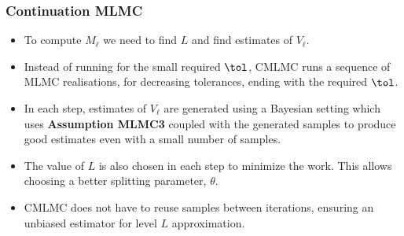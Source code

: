 


\begin{frame}\frametitle{Continuation MLMC}
\begin{itemize}
\item To compute $M_\ell$ we need to find $L$ and find estimates of
  $V_\ell$.
\pause
    \item Instead of running for the small required $\tol$, CMLMC runs
      a sequence of MLMC realisations, for decreasing
      tolerances, ending with the required $\tol$.
    \item In each step, estimates of $V_\ell$ are generated using a
      Bayesian setting which uses {\bf Assumption MLMC3} coupled with
      the generated samples to produce good estimates even with a
      small number of samples.
    \item The value of $L$ is also chosen in each step to minimize the
      work. This allows choosing a better splitting parameter,
      $\theta$.
    \item CMLMC does not have to reuse samples between iterations,
      ensuring an unbiased estimator for level $L$ approximation.
  \end{itemize}
\end{frame}

